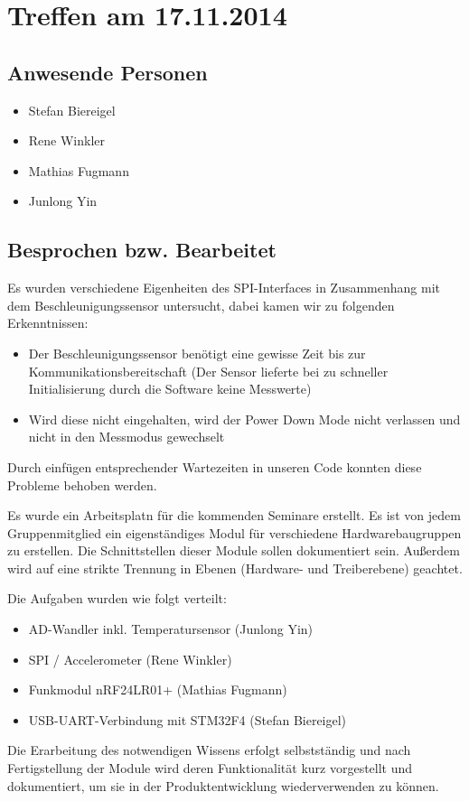 \chapter{Treffen am 17.11.2014}
\section{Anwesende Personen}
\begin{itemize}
	\item Stefan Biereigel
	\item Rene Winkler
	\item Mathias Fugmann
	\item Junlong Yin
\end{itemize}

\section{Besprochen bzw. Bearbeitet}
Es wurden verschiedene Eigenheiten des SPI-Interfaces in Zusammenhang mit dem Beschleunigungssensor untersucht, dabei kamen wir zu folgenden Erkenntnissen:
\begin{itemize}
	\item Der Beschleunigungssensor benötigt eine gewisse Zeit bis zur Kommunikationsbereitschaft (Der Sensor lieferte bei zu schneller Initialisierung durch die Software keine Messwerte)
	\item Wird diese nicht eingehalten, wird der Power Down Mode nicht verlassen und nicht in den Messmodus gewechselt
\end{itemize}
Durch einfügen entsprechender Wartezeiten in unseren Code konnten diese Probleme behoben werden. 

Es wurde ein Arbeitsplatn für die kommenden Seminare erstellt. Es ist von jedem Gruppenmitglied ein eigenständiges Modul für verschiedene Hardwarebaugruppen zu erstellen. Die Schnittstellen dieser Module sollen dokumentiert sein. Außerdem wird auf eine strikte Trennung in Ebenen (Hardware- und Treiberebene) geachtet.

Die Aufgaben wurden wie folgt verteilt:
\begin{itemize}
	\item AD-Wandler inkl. Temperatursensor (Junlong Yin)
	\item SPI / Accelerometer (Rene Winkler)
	\item Funkmodul nRF24LR01+ (Mathias Fugmann)
	\item USB-UART-Verbindung mit STM32F4 (Stefan Biereigel)
\end{itemize}

Die Erarbeitung des notwendigen Wissens erfolgt selbstständig und nach Fertigstellung der Module wird deren Funktionalität kurz vorgestellt und dokumentiert, um sie in der Produktentwicklung wiederverwenden zu können.